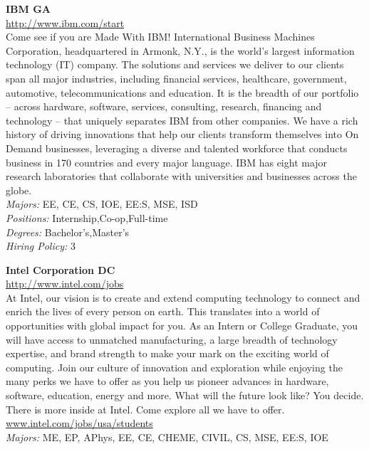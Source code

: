 \documentclass[twoside]{article}
\begin{document}
\begin{center}
\begin{multicols}{2}
 \begin{minipage}{.95\columnwidth}{\Large\bf IBM \hfill GA}\\
    \url{http://www.ibm.com/start}\\
    Come see if you are Made With IBM! International Business Machines Corporation, headquartered in Armonk, N.Y., is the world's largest information technology (IT) company. The solutions and services we deliver to our clients span all major industries, including financial services, healthcare, government, automotive, telecommunications and education. It is the breadth of our portfolio -- across hardware, software, services, consulting, research, financing and technology -- that uniquely separates IBM from other companies. We have a rich history of driving innovations that help our clients transform themselves into On Demand businesses, leveraging a diverse and talented workforce that conducts business in 170 countries and every major language. IBM has eight major research laboratories that collaborate with universities and businesses across the globe.\\
    \emph{Majors:} EE, CE, CS, IOE, EE:S, MSE, ISD\\
    \emph{Positions:} Internship,Co-op,Full-time\\
    \emph{Degrees:} Bachelor's,Master's\\
    \emph{Hiring Policy:} 3\\
\end{minipage}
 \begin{minipage}{.95\columnwidth}{\Large\bf Intel Corporation \hfill DC}\\
    \url{http://www.intel.com/jobs}\\
    At Intel, our vision is to create and extend computing technology to connect and enrich the lives of every person on earth. This translates into a world of opportunities with global impact for you. As an Intern or College Graduate, you will have access to unmatched manufacturing, a large breadth of technology expertise, and brand strength to make your mark on the exciting world of computing. Join our culture of innovation and exploration while enjoying the many perks we have to offer as you help us pioneer advances in hardware, software, education, energy and more. What will the future look like? You decide. There is more inside at Intel. Come explore all we have to offer. \url{www.intel.com/jobs/usa/students}\\
    \emph{Majors:} ME, EP, APhys, EE, CE, CHEME, CIVIL, CS, MSE, EE:S, IOE\\

\end{minipage}
\end{multicols}
\end{center}
\end{document}
